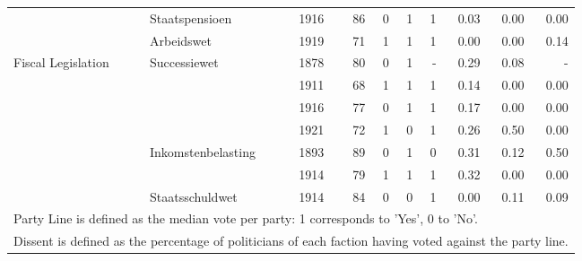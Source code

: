 \begin{table}
\begin{tabular}[t]{lllrrrrrrr}
 & Staatspensioen & 1916 & 86 & \num{0} & \num{1} & \num{1} & \num{0.03} & \num{0.00} & \num{0.00}\\
 & Arbeidswet & 1919 & 71 & \num{1} & \num{1} & \num{1} & \num{0.00} & \num{0.00} & \num{0.14}\\
Fiscal Legislation & Successiewet & 1878 & 80 & \num{0} & \num{1} & - & \num{0.29} & \num{0.08} & -\\
 &  & 1911 & 68 & \num{1} & \num{1} & \num{1} & \num{0.14} & \num{0.00} & \num{0.00}\\
 &  & 1916 & 77 & \num{0} & \num{1} & \num{1} & \num{0.17} & \num{0.00} & \num{0.00}\\
 &  & 1921 & 72 & \num{1} & \num{0} & \num{1} & \num{0.26} & \num{0.50} & \num{0.00}\\
 & Inkomstenbelasting & 1893 & 89 & \num{0} & \num{1} & \num{0} & \num{0.31} & \num{0.12} & \num{0.50}\\
 &  & 1914 & 79 & \num{1} & \num{1} & \num{1} & \num{0.32} & \num{0.00} & \num{0.00}\\
 & Staatsschuldwet & 1914 & 84 & \num{0} & \num{0} & \num{1} & \num{0.00} & \num{0.11} & \num{0.09}\\
\bottomrule
\multicolumn{10}{l}{\rule{0pt}{1em}Party Line is defined as the median vote per party: 1 corresponds to 'Yes', 0 to 'No'.}\\
\multicolumn{10}{l}{\rule{0pt}{1em}Dissent is defined as the percentage of politicians of each faction having voted against the party line.}\\
\end{tabular}
\end{table}
